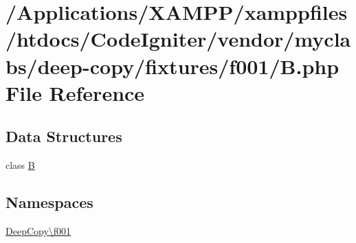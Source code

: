 \hypertarget{f001_2_b_8php}{}\section{/\+Applications/\+X\+A\+M\+P\+P/xamppfiles/htdocs/\+Code\+Igniter/vendor/myclabs/deep-\/copy/fixtures/f001/B.php File Reference}
\label{f001_2_b_8php}
\subsection*{Data Structures}
\begin{DoxyCompactItemize}
\item 
class \mbox{\hyperlink{class_deep_copy_1_1f001_1_1_b}{B}}
\end{DoxyCompactItemize}
\subsection*{Namespaces}
\begin{DoxyCompactItemize}
\item 
 \mbox{\hyperlink{namespace_deep_copy_1_1f001}{Deep\+Copy\textbackslash{}f001}}
\end{DoxyCompactItemize}
